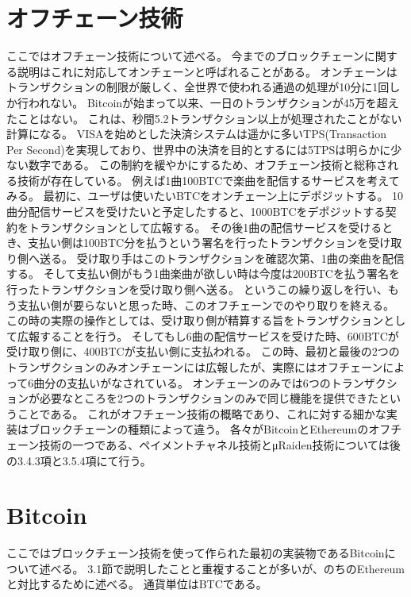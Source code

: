 \section{オフチェーン技術}
ここではオフチェーン技術について述べる。
今までのブロックチェーンに関する説明はこれに対応してオンチェーンと呼ばれることがある。
オンチェーンはトランザクションの制限が厳しく、全世界で使われる通過の処理が10分に1回しか行われない。
Bitcoinが始まって以来、一日のトランザクションが45万を超えたことはない。
これは、秒間5.2トランザクション以上が処理されたことがない計算になる。
VISAを始めとした決済システムは遥かに多いTPS(Transaction Per Second)を実現しており、世界中の決済を目的とするには5TPSは明らかに少ない数字である。
この制約を緩やかにするため、オフチェーン技術と総称される技術が存在している。
例えば1曲100BTCで楽曲を配信するサービスを考えてみる。
最初に、ユーザは使いたいBTCをオンチェーン上にデポジットする。
10曲分配信サービスを受けたいと予定したすると、1000BTCをデポジットする契約をトランザクションとして広報する。
その後1曲の配信サービスを受けるとき、支払い側は100BTC分を払うという署名を行ったトランザクションを受け取り側へ送る。
受け取り手はこのトランザクションを確認次第、1曲の楽曲を配信する。
そして支払い側がもう1曲楽曲が欲しい時は今度は200BTCを払う署名を行ったトランザクションを受け取り側へ送る。
というこの繰り返しを行い、もう支払い側が要らないと思った時、このオフチェーンでのやり取りを終える。
この時の実際の操作としては、受け取り側が精算する旨をトランザクションとして広報することを行う。
そしてもし6曲の配信サービスを受けた時、600BTCが受け取り側に、400BTCが支払い側に支払われる。
この時、最初と最後の2つのトランザクションのみオンチェーンには広報したが、実際にはオフチェーンによって6曲分の支払いがなされている。
オンチェーンのみでは6つのトランザクションが必要なところを2つのトランザクションのみで同じ機能を提供できたということである。
これがオフチェーン技術の概略であり、これに対する細かな実装はブロックチェーンの種類によって違う。
各々がBitcoinとEthereumのオフチェーン技術の一つである、ペイメントチャネル技術とμRaiden技術については後の3.4.3項と3.5.4項にて行う。

\section{Bitcoin}
ここではブロックチェーン技術を使って作られた最初の実装物であるBitcoinについて述べる。
3.1節で説明したことと重複することが多いが、のちのEthereumと対比するために述べる。
通貨単位はBTCである。

